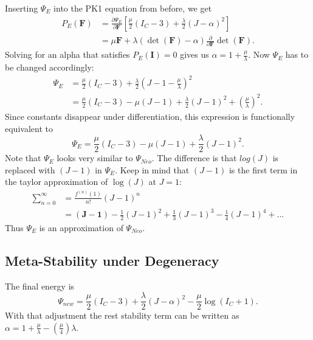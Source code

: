 Inserting $\Psi_E$ into the PK1 equation from before, we get
\begin{align*}
P_{E}(\mathbf{F}) &= \frac{\partial \Psi_{E}}{\partial \mathbf{F}} \left[ \frac{\mu}{2}\left(I_{C}-3\right) +\frac{\lambda}{2}(J-\alpha)^{2} \right] \\
&= \mu \mathbf{F} + \lambda (\operatorname{det}(\mathbf{F})-\alpha)  \frac{\partial}{\partial \mathbf{F}} \operatorname{det}(\mathbf{F}).
\end{align*}
Solving for an alpha that satisfies $P_{E}(\mathbf{I})=0$ gives us $\alpha=1+\frac{\mu}{\lambda}$. Now $\Psi_{E}$ has to be changed accordingly:
\begin{align*}
\Psi_{E} &= \frac{\mu}{2}\left(I_{C}-3\right) +\frac{\lambda}{2}(J-1-\frac{\mu}{\lambda})^{2} \\
&= \frac{\mu}{2}\left(I_{C}-3\right) - \mu\left(J-1\right) + \frac{\lambda}{2}(J-1)^{2} + \left(\frac{\mu}{\lambda}\right)^{2}.
\end{align*}
Since constants disappear under differentiation, this expression is functionally equivalent to 
\[
\Psi_{E} = \frac{\mu}{2}\left(I_{C}-3\right) - \mu\left(J-1\right) + \frac{\lambda}{2}(J-1)^{2}.
\]
Note that $\Psi_{E}$ looks very similar to $\Psi_{Neo}$. The difference is that $log(J)$ is replaced with $(J-1)$ in $\Psi_{E}$. Keep in mind that $(J-1)$ is the first term in the taylor approximation of $\operatorname{log}(J)$ at $J=1$:
\begin{align*}
\sum_{n=0}^{\infty} &= \frac{f^{(n)}(1)}{n!} (J-1)^{n} \\
&= \boldsymbol{(J-1)} - \frac{1}{2} (J-1)^{2} + \frac{1}{3} (J-1)^{3} -\frac{1}{4} (J-1)^{4} + \text{...}
\end{align*}
Thus $\Psi_{E}$ is an approximation of $\Psi_{Neo}$.


\subsection{Meta-Stability under Degeneracy}
The final energy is
\begin{equation}\label{eq:stable_energy}
\Psi_{new} = \frac{\mu}{2}\left(I_{C}-3\right) + \frac{\lambda}{2}(J-\alpha)^{2} - \frac{\mu}{2} \operatorname{log}\left(I_{C}+1\right).
\end{equation}
With that adjustment the rest stability term can be written as $\alpha=1+\frac{\mu}{\lambda}-\left(\frac{\mu}{4}\right)\lambda$.

